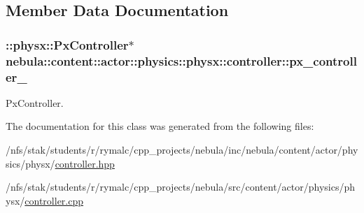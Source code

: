 \subsection{Member Data Documentation}
\hypertarget{classnebula_1_1content_1_1actor_1_1physics_1_1physx_1_1controller_a94536c60497730a5cd85ecfbdbc8b1ff}{
\subsubsection[{px\_\-controller\_\-}]{\setlength{\rightskip}{0pt plus 5cm}::physx::PxController$\ast$ {\bf nebula::content::actor::physics::physx::controller::px\_\-controller\_\-}}}
\label{classnebula_1_1content_1_1actor_1_1physics_1_1physx_1_1controller_a94536c60497730a5cd85ecfbdbc8b1ff}


PxController. 

The documentation for this class was generated from the following files:\begin{DoxyCompactItemize}
\item 
/nfs/stak/students/r/rymalc/cpp\_\-projects/nebula/inc/nebula/content/actor/physics/physx/\hyperlink{physics_2physx_2controller_8hpp}{controller.hpp}\item 
/nfs/stak/students/r/rymalc/cpp\_\-projects/nebula/src/content/actor/physics/physx/\hyperlink{physics_2physx_2controller_8cpp}{controller.cpp}\end{DoxyCompactItemize}
